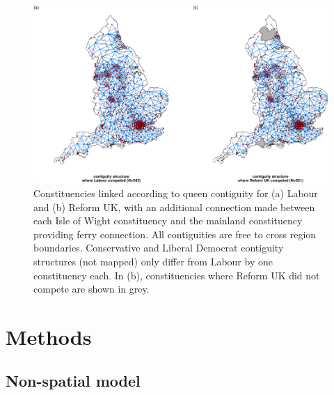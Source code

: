 \documentclass[webpdf,large,contemporary,namedate]{oup-authoring-template}
\theoremstyle{thmstyleone}
\theoremstyle{thmstyletwo}
\theoremstyle{thmstylethree}
\begin{document}
\begin{figure}[th]

{\centering \includegraphics[width=1\linewidth]{jrss_resubmission3_files/figure-latex/figspatial-1} 

}

\caption{Constituencies linked according to queen contiguity for (a) Labour and (b) Reform UK, with an additional connection made between each Isle of Wight constituency and the mainland constituency providing ferry connection. All contiguities are free to cross region boundaries. Conservative and Liberal Democrat contiguity structures (not mapped) only differ from Labour by one constituency each. In (b), constituencies where Reform UK did not compete are shown in grey.}\label{fig:figspatial}
\end{figure}

\section{Methods}\label{methods}

\subsection{Non-spatial model}\label{non-spatial-model}
\end{document}
